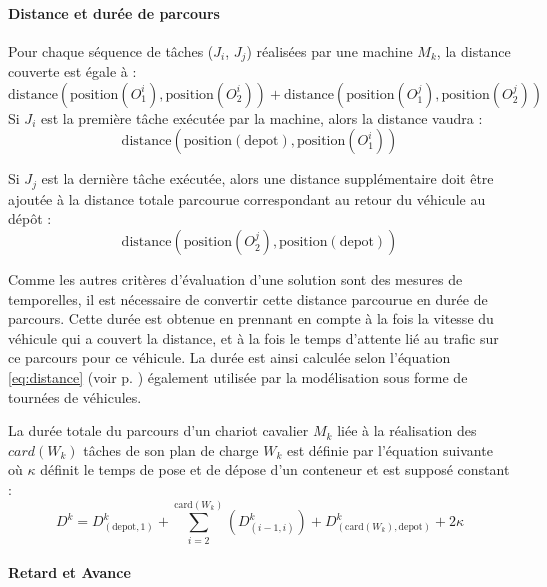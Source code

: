 \paragraph{Distance et durée de parcours}

Pour chaque séquence de tâches ($J_i$, $J_j$) réalisées par une machine $M_k$, la distance couverte est égale à :
\begin{equation}
\text{distance}(\text{position}(O_1^i),\text{position}(O_2^i)) + \text{distance}(\text{position}(O_1^j),\text{position}(O_2^j)) 
\end{equation}
Si $J_i$ est la première tâche exécutée par la machine, alors la distance vaudra :
\begin{equation}
\text{distance}(\text{position}(\text{depot}),\text{position}(O_1^i)) 
\end{equation}

Si $J_j$ est la dernière tâche exécutée, alors une distance supplémentaire doit être ajoutée à la distance totale parcourue correspondant au retour du véhicule au dépôt : 
\begin{equation}
\text{distance}(\text{position}(O_2^j),\text{position}(\text{depot}))
\end{equation}

Comme les autres critères d'évaluation d'une solution sont des mesures de temporelles, il est nécessaire de convertir cette distance parcourue en durée de parcours. Cette durée est obtenue en prennant en compte à la fois la vitesse du véhicule qui a couvert la distance, et à la fois le temps d'attente lié au trafic sur ce parcours pour ce véhicule. La durée est ainsi calculée selon l'équation \ref{eq:distance} (voir p. \pageref{eq:distance}) également utilisée par la modélisation sous forme de tournées de véhicules.

La durée totale du parcours d'un chariot cavalier $M_k$ liée à la réalisation des $card(W_k)$ tâches de son plan de charge $W_k$ est définie par l'équation suivante où $\kappa$ définit le temps de pose et de dépose d'un conteneur et est supposé constant : 
\begin{equation}
D^k = D^k_{(\text{depot},1)} + \sum \limits_{i=2}^{\text{card}(W_k)} \left( D^k_{(i-1, i)} \right) + D^k_{\left(\text{card}\left(W_k\right), \text{depot}\right)} + 2\kappa
\end{equation}


\paragraph{Retard et Avance}

